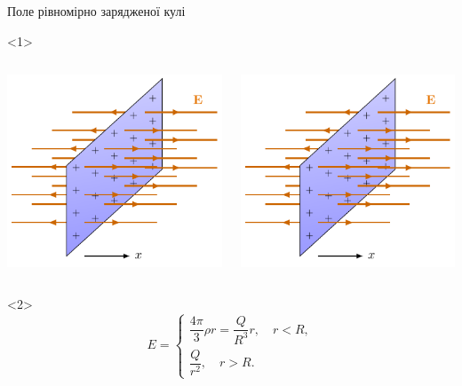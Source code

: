\documentclass{beamer}
\begin{document}
\begin{frame}{Поле рівномірно зарядженої кулі}{}
	\begin{onlyenv}
		\begin{columns}
			\begin{column}{0.5\linewidth}\centering
				\includegraphics[scale=1,page=5]{tikz/GaussExamples.pdf}
			\end{column}
			\begin{column}{0.5\linewidth}\centering
				\includegraphics[scale=1,page=4]{tikz/GaussExamples.pdf}
			\end{column}
		\end{columns}
	\end{onlyenv}
	\begin{onlyenv}
		\begin{equation*}
			{E} =
			\begin{cases}
				\dfrac{4\pi}{3}\rho r = \dfrac{Q}{R^3} r, \quad r < R, \\
				\dfrac{Q}{r^2}, \quad r > R.
			\end{cases}
		\end{equation*}

		\begin{center}
			
		\end{center}

	\end{onlyenv}
\end{frame}
\end{document}
